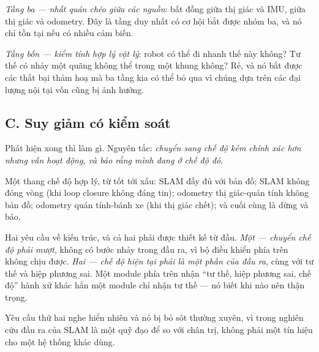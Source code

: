 \documentclass[../../vslam.tex]{subfiles}
\begin{document}
\emph{Tầng ba --- nhất quán chéo giữa các nguồn}: bất đồng giữa thị giác và IMU, giữa thị giác và odometry. Đây là tầng duy nhất có cơ hội bắt được nhóm ba, và nó chỉ tồn tại nếu có nhiều cảm biến.

\emph{Tầng bốn --- kiểm tính hợp lý vật lý}: robot có thể đi nhanh thế này không? Tư thế có nhảy một quãng không thể trong một khung không? Rẻ, và nó bắt được các thất bại thảm hoạ mà ba tầng kia có thể bỏ qua vì chúng dựa trên các đại lượng nội tại vốn cũng bị ảnh hưởng.

\subsection{C. Suy giảm có kiểm soát}

Phát hiện xong thì làm gì. Nguyên tắc: \emph{chuyển sang chế độ kém chính xác hơn nhưng vẫn hoạt động, và báo rằng mình đang ở chế độ đó}.

Một thang chế độ hợp lý, từ tốt tới xấu: SLAM đầy đủ với bản đồ; SLAM không đóng vòng (khi loop closure không đáng tin); odometry thị giác-quán tính không bản đồ; odometry quán tính-bánh xe (khi thị giác chết); và cuối cùng là dừng và báo.

Hai yêu cầu về kiến trúc, và cả hai phải được thiết kế từ đầu. \emph{Một --- chuyển chế độ phải mượt}, không có bước nhảy trong đầu ra, vì bộ điều khiển phía trên không chịu được. \emph{Hai --- chế độ hiện tại phải là một phần của đầu ra}, cùng với tư thế và hiệp phương sai. Một module phía trên nhận ``tư thế, hiệp phương sai, chế độ'' hành xử khác hẳn một module chỉ nhận tư thế --- nó biết khi nào nên thận trọng.

Yêu cầu thứ hai nghe hiển nhiên và nó bị bỏ sót thường xuyên, vì trong nghiên cứu đầu ra của SLAM là một quỹ đạo để so với chân trị, không phải một tín hiệu cho một hệ thống khác dùng.

\begin{ungdung}
\end{ungdung}
\end{document}
